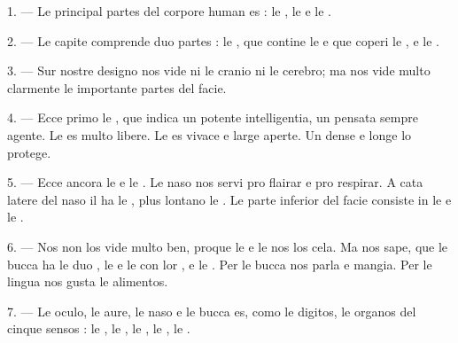 
\VUsaut{4.0mm}
\VUsaut{2.0mm}

\VUsaut{2.4mm}
\VUsaut{3.0mm}

\VUsaut{3.0mm}

1. --- Le principal partes del corpore human es : le , le
 e le .

2. --- Le capite comprende duo partes : le , que contine le
 e que coperi le , e le .

3. --- Sur nostre designo nos vide ni le cranio ni le cerebro; ma nos vide
multo clarmente le importante partes del facie.

4. --- Ecce primo le , que indica un potente intelligentia, un
pensata sempre agente. Le  es multo libere. Le 
es vivace e large aperte. Un dense  e longe 
lo protege.

5. --- Ecce ancora le  e le . Le naso nos servi
pro flairar e pro respirar. A cata latere del naso il ha le , plus
lontano le . Le parte inferior del facie consiste in le
 e le .

6. --- Nos non los vide multo ben, proque le  e le
 nos los cela. Ma nos sape, que le bucca ha le duo
, le  e le  con
lor , e le . Per le bucca nos parla e mangia. Per
le lingua nos gusta le alimentos.

7. --- Le oculo, le aure, le naso e le bucca es, como le digitos, le organos del
cinque sensos : le , le , le , le
, le .

